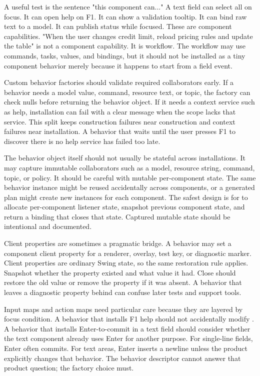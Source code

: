 A useful test is the sentence "this component can..." A text field can select
all on focus. It can open help on F1. It can show a validation tooltip. It can
bind raw text to a model. It can publish status while focused. These are
component capabilities. "When the user changes credit limit, reload pricing
rules and update the table" is not a component capability. It is workflow. The
workflow may use commands, tasks, values, and bindings, but it should not be
installed as a tiny component behavior merely because it happens to start from
a field event.

Custom behavior factories should validate required collaborators early. If a
behavior needs a model value, command, resource text, or topic, the factory can
check nulls before returning the behavior object. If it needs a context service
such as help, installation can fail with a clear message when the scope lacks
that service. This split keeps construction failures near construction and
context failures near installation. A behavior that waits until the user presses
F1 to discover there is no help service has failed too late.

The behavior object itself should not usually be stateful across installations.
It may capture immutable collaborators such as a model, resource string,
command, topic, or policy. It should be careful with mutable per-component
state. The same behavior instance might be reused accidentally across
components, or a generated plan might create new instances for each component.
The safest design is for  to allocate per-component listener
state, snapshot previous component state, and return a binding that closes that
state. Captured mutable state should be intentional and documented.

Client properties are sometimes a pragmatic bridge. A behavior may set a
component client property for a renderer, overlay, test key, or diagnostic
marker. Client properties are ordinary Swing state, so the same restoration
rule applies. Snapshot whether the property existed and what value it had.
Close should restore the old value or remove the property if it was absent. A
behavior that leaves a diagnostic property behind can confuse later tests and
support tools.

Input maps and action maps need particular care because they are layered by
focus condition. A behavior that installs  F1 help should
not accidentally modify . A behavior
that installs Enter-to-commit in a text field should consider whether the text
component already uses Enter for another purpose. For single-line fields,
Enter often commits. For text areas, Enter inserts a newline unless the product
explicitly changes that behavior. The behavior descriptor cannot answer that
product question; the factory choice must.

